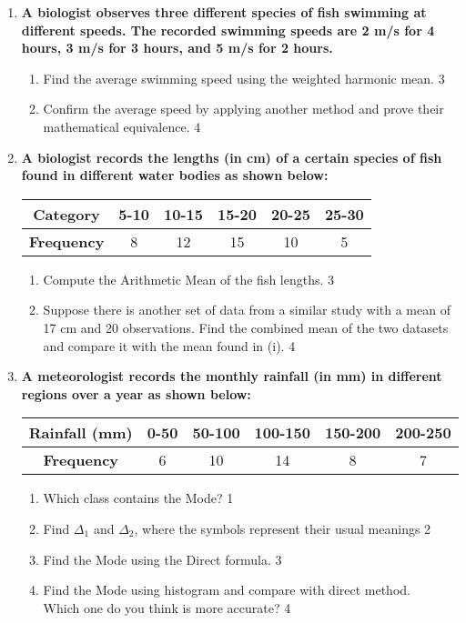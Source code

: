 \documentclass[a4paper,oneside]{book}
\begin{document}
\begin{enumerate}
  \item
\textbf{A biologist observes three different species of fish swimming at 
different speeds. The recorded swimming speeds are 2 m/s for 4 hours, 
3 m/s for 3 hours, and 5 m/s for 2 hours.}

\begin{enumerate}
    \item  
    Find the average swimming speed using the weighted harmonic mean. \hfill 3
    \item
    Confirm the average speed by applying another method and prove their 
    mathematical equivalence. \hfill 4
\end{enumerate}

\item
\textbf{A biologist records the lengths (in cm) of a certain species of 
fish found in different water bodies as shown below:}

\begin{table}[h]
\centering
\begin{tabular}{c|c|c|c|c|c}
\textbf{Category} & 5-10 & 10-15 & 15-20 & 20-25 & 25-30 \\ \hline
\textbf{Frequency} & 8    & 12    & 15    & 10    & 5     
\end{tabular}
\end{table}

\begin{enumerate}
    \item  
    Compute the Arithmetic Mean of the fish lengths. \hfill 3
    \item
    Suppose there is another set of data from a similar study with a mean of 17 cm and 20 observations. Find the combined mean of the two datasets and compare it with the mean found in (i). \hfill 4
\end{enumerate}

 \item
	  \textbf{A meteorologist records the monthly rainfall (in mm) in different regions over a year as shown below:}

\begin{table}[h]
\centering
\begin{tabular}{c|c|c|c|c|c}
\textbf{Rainfall (mm)} & 0-50 & 50-100 & 100-150 & 150-200 & 200-250 \\ \hline
\textbf{Frequency}     & 6    & 10     & 14      & 8       & 7       
\end{tabular}
\end{table}

  
  \begin{enumerate}
    \item
	Which class contains the Mode? \hfill 1
    \item
	Find $\Delta_1$ and $\Delta_2$, where the symbols represent their usual meanings \hfill 2
    \item  
	Find the Mode using the Direct formula. \hfill 3
    \item
	Find the Mode using histogram and compare with direct method. \\ Which one do you think is more accurate? \hfill 4
  \end{enumerate}
  

\end{enumerate}
\end{document}
